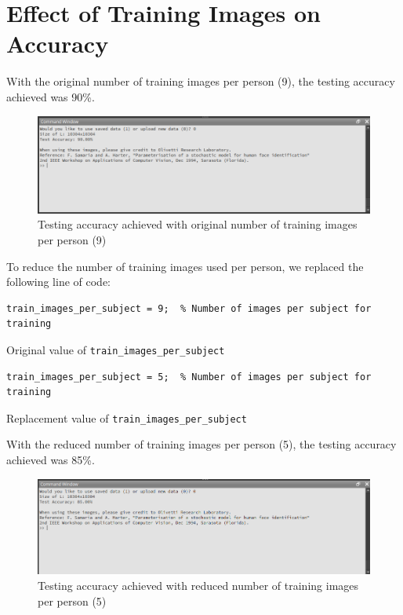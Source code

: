\documentclass[a4paper]{article}
\newenvironment{code}{\captionsetup{type=listing}}{}
\begin{document}
\section{Effect of Training Images on Accuracy}
With the original number of training images per person (9), the testing accuracy achieved was 90\%.
\begin{figure}[H]
    \centering
    \includegraphics[width=\textwidth]{./images/9trainingimgs.png}
    \caption{Testing accuracy achieved with original number of training images per person (9)}
\end{figure}

To reduce the number of training images used per person, we replaced the following line of code:
\begin{code}
\begin{verbatim}
train_images_per_subject = 9;  % Number of images per subject for training
\end{verbatim}
\caption{Original value of \texttt{train_images_per_subject}}
\end{code}

\begin{code}
\begin{verbatim}
train_images_per_subject = 5;  % Number of images per subject for training
\end{verbatim}
\caption{Replacement value of \texttt{train_images_per_subject}}
\end{code}

With the reduced number of training images per person (5), the testing accuracy achieved was 85\%.
\begin{figure}[H]
    \centering
    \includegraphics[width=\textwidth]{./images/5trainingimgs.png}
    \caption{Testing accuracy achieved with reduced number of training images per person (5)}
\end{figure}
\end{document}
